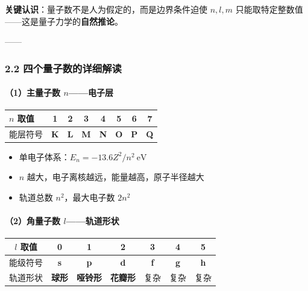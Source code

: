 \documentclass[a4paper,11pt]{ctexart}
\providecommand{\tightlist}{\setlength{\itemsep}{0pt}\setlength{\parskip}{0pt}}
\newcounter{none}
\begin{document}
\textbf{关键认识}：量子数不是人为假定的，而是边界条件迫使 \(n,l,m\) 只能取特定整数值------这是量子力学的\textbf{自然推论}。

------

\subsubsection{2.2 四个量子数的详细解读}\label{ux56dbux4e2aux91cfux5b50ux6570ux7684ux8be6ux7ec6ux89e3ux8bfb}

\paragraph{\texorpdfstring{（1）主量子数 \(n\)------电子层}{（1）主量子数 n------电子层}}\label{ux4e3bux91cfux5b50ux6570-nux7535ux5b50ux5c42}

{\def\LTcaptype{none} %
\begin{longtable}[]{@{}lccccccc@{}}
\toprule\noalign{}
\(n\) 取值 & 1 & 2 & 3 & 4 & 5 & 6 & 7 \\
\midrule\noalign{}
\endhead
\bottomrule\noalign{}
\endlastfoot
能层符号 & \textbf{K} & \textbf{L} & \textbf{M} & \textbf{N} & \textbf{O} & \textbf{P} & \textbf{Q} \\
\end{longtable}
}

\begin{itemize}
\tightlist
\item
  单电子体系：\(E_n = -13.6 Z^2/n^2\ \mathrm{eV}\)
\item
  \(n\) 越大，电子离核越远，能量越高，原子半径越大
\item
  轨道总数 \(n^2\)，最大电子数 \(2n^2\)
\end{itemize}

\paragraph{\texorpdfstring{（2）角量子数 \(l\)------轨道形状}{（2）角量子数 l------轨道形状}}\label{ux89d2ux91cfux5b50ux6570-lux8f68ux9053ux5f62ux72b6}

{\def\LTcaptype{none} %
\begin{longtable}[]{@{}ccccccc@{}}
\toprule\noalign{}
\(l\) 取值 & 0 & 1 & 2 & 3 & 4 & 5 \\
\midrule\noalign{}
\endhead
\bottomrule\noalign{}
\endlastfoot
能级符号 & \textbf{s} & \textbf{p} & \textbf{d} & \textbf{f} & \textbf{g} & \textbf{h} \\
轨道形状 & \textbf{球形} & \textbf{哑铃形} & \textbf{花瓣形} & 复杂 & 复杂 & 复杂 \\
\end{longtable}
}
\end{document}
